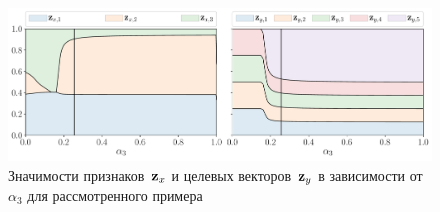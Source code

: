 \begin{figure}
	\centering
	\includegraphics[width=\linewidth]{figs/ch3/features_vs_alpha.pdf}
	\caption{Значимости признаков~$\mathbf{z}_x$ и целевых векторов~$\mathbf{z}_y$ в зависимости от~$\alpha_3$ для рассмотренного примера}
	\label{ch3:fig:features_vs_alpha}
\end{figure}

